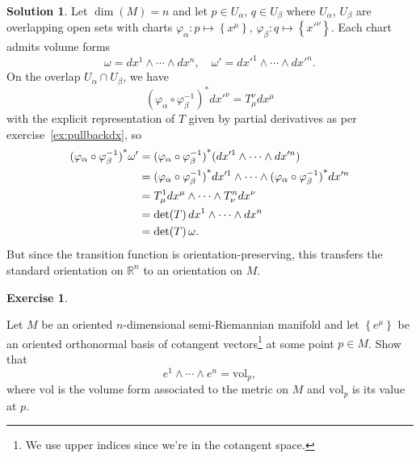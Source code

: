 \documentclass[11pt, a4paper]{report}
\theoremstyle{definition}
\newtheorem{exercise}{Exercise}[part]
\newtheorem{solution}{Solution}[part]
\newenvironment{ex}{\begin{exercise}}{\end{exercise}\pagebreak[1]}
\newenvironment{sol}{\begin{solution}}{\end{solution}\pagebreak[3]}
\newcommand*{\op}[1]{\ensuremath\mathop{}\mathopen{}#1}
\renewcommand*{\d}{\op{d}}
\begin{document}
\begin{sol}

Let $\dim(M) = n$ and let $p \in U_\alpha$, $q \in U_\beta$ where $U_\alpha$, $U_\beta$ are overlapping open sets with charts $\varphi_\alpha: p \mapsto \left\{x^\mu\right\}$, $\varphi_\beta: q \mapsto \left\{x'^\nu\right\}$. Each chart admits volume forms
\[
    \omega = dx^1 \wedge \cdots \wedge dx^n, \quad
    \omega' = dx'^1 \wedge \cdots \wedge dx'^n.
\]
On the overlap $U_\alpha \cap U_\beta$, we have
\[
{(\varphi_\alpha \circ \varphi_\beta^{-1})}^* dx'^\nu = T_\mu^\nu dx^\mu
\]
with the explicit representation of $T$ given by partial derivatives as per exercise~\ref{ex:pullbackdx}, so
\begin{align*}
    {(\varphi_\alpha \circ \varphi_\beta^{-1})}^* \omega' &= {(\varphi_\alpha \circ \varphi_\beta^{-1})}^* (dx'^1 \wedge \cdots \wedge dx'^n) \\
        &= {(\varphi_\alpha \circ \varphi_\beta^{-1})}^* dx'^1 \wedge \cdots \wedge {(\varphi_\alpha \circ \varphi_\beta^{-1})}^* dx'^n \\
        &= T_\mu^1 dx^\mu \wedge \cdots \wedge T_\nu^n dx^\nu \\
        &= \det(T) \d x^1 \wedge \cdots \wedge dx^n \\
        &= \det(T) \, \omega.
\end{align*}
But since the transition function is orientation-preserving, this transfers the standard orientation on $\mathbb{R}^n$ to an orientation on $M$.

\end{sol}

\begin{ex}\label{ex:canonicalvolumeform}

Let $M$ be an oriented $n$-dimensional semi-Riemannian manifold and let $\left\{e^\mu\right\}$ be an oriented orthonormal basis of cotangent vectors\footnote{We use upper indices since we're in the cotangent space.} at some point $p \in M$. Show that
\[
    e^1 \wedge \cdots \wedge e^n = \text{vol}_p,
\]
where $\text{vol}$ is the volume form associated to the metric on $M$ and $\text{vol}_p$ is its value at $p$.

\end{ex}
\end{document}
